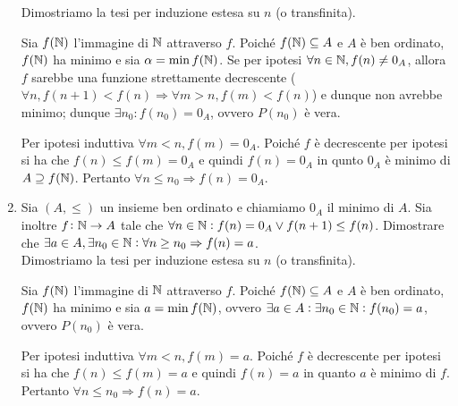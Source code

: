 \begin{enumerate}
  Dimostriamo la tesi per induzione estesa su $ n $ (o transfinita).
  \begin{pbase}
    Sia $ f(\mathbb{N}) $ l'immagine di $ \mathbb{N} $ attraverso $ f $. Poiché $ f(\mathbb{N}) \subseteq A $ e $ A $ è ben ordinato, $ f(\mathbb{N}) $ ha minimo e sia $ \alpha = \min f(\mathbb{N}) $. Se per ipotesi $ \forall n \in \mathbb{N}, f(n) \neq 0_A $, allora $ f $ sarebbe una funzione strettamente decrescente ($ \forall n, f(n + 1) < f(n) \Rightarrow \forall m > n, f(m) < f(n) $) e dunque non avrebbe minimo; dunque $ \exists n_0 : f(n_0) = 0_A $, ovvero $ P(n_0) $ è vera.
  \end{pbase}
  \begin{pind}
    Per ipotesi induttiva $ \forall m < n, f(m) = 0_A $. Poiché $ f $ è decrescente per ipotesi si ha che $ f(n) \leq f(m) = 0_A $ e quindi $ f(n) = 0_A $ in qunto $ 0_A $ è minimo di $ A \supseteq f(\mathbb{N}) $. Pertanto $ \forall n \leq n_0 \Rightarrow f(n) = 0_A $.
  \end{pind}
\item Sia $ (A, \leq) $ un insieme ben ordinato e chiamiamo $ 0_A $ il minimo di $ A $. Sia inoltre $ f \colon \mathbb{N} \to A $ tale che $ \forall n \in \mathbb{N} : f(n) = 0_A \vee f(n + 1) \leq f(n) $. Dimostrare che $ \exists a \in A, \exists n_0 \in \mathbb{N} : \forall n \geq n_0 \Rightarrow f(n) = a $. \\

  Dimostriamo la tesi per induzione estesa su $ n $ (o transfinita).
  \begin{pbase}
    Sia $ f(\mathbb{N}) $ l'immagine di $ \mathbb{N} $ attraverso $ f $. Poiché $ f(\mathbb{N}) \subseteq A $ e $ A $ è ben ordinato, $ f(\mathbb{N}) $ ha minimo e sia $ a = \min f(\mathbb{N}) $, ovvero $ \exists a \in A : \exists n_0 \in \mathbb{N} : f(n_0) = a $, ovvero $ P(n_0) $ è vera.
  \end{pbase}
  \begin{pind}
    Per ipotesi induttiva $ \forall m < n, f(m) = a $. Poiché $ f $ è decrescente per ipotesi si ha che $ f(n) \leq f(m) = a $ e quindi $ f(n) = a $ in quanto $ a $ è minimo di $ f $. Pertanto $ \forall n \leq n_0 \Rightarrow f(n) = a $.
  \end{pind}
\end{enumerate}